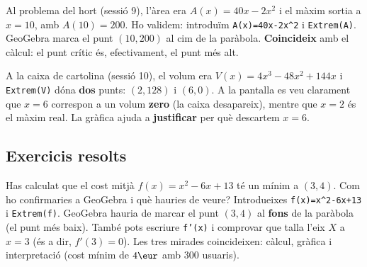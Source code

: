 \begin{exemple}
Al problema del hort (sessió 9), l'àrea era $A(x)=40x-2x^2$ i el màxim sortia a $x=10$,
amb $A(10)=200$. Ho validem: introduïm \texttt{A(x)=40x-2x\^{}2} i \texttt{Extrem(A)}.
GeoGebra marca el punt $(10,200)$ al cim de la paràbola. \textbf{Coincideix} amb el
càlcul: el punt crític és, efectivament, el punt més alt.
\begin{center}

\end{center}
\end{exemple}

\begin{exemple}
A la caixa de cartolina (sessió 10), el volum era $V(x)=4x^3-48x^2+144x$ i
\texttt{Extrem(V)} dóna \textbf{dos} punts: $(2,128)$ i $(6,0)$. A la pantalla es veu
clarament que $x=6$ correspon a un volum \textbf{zero} (la caixa desapareix), mentre que
$x=2$ és el màxim real. La gràfica ajuda a \textbf{justificar} per què descartem $x=6$.
\end{exemple}

\subsection{Exercicis resolts}

\begin{exresolt}
Has calculat que el cost mitjà $f(x)=x^2-6x+13$ té un mínim a $(3,4)$. Com ho
confirmaries a GeoGebra i què hauries de veure?
\solucio
Introdueixes \texttt{f(x)=x\^{}2-6x+13} i \texttt{Extrem(f)}. GeoGebra hauria de marcar
el punt $(3,4)$ al \textbf{fons} de la paràbola (el punt més baix). També pots escriure
\texttt{f'(x)} i comprovar que talla l'eix $X$ a $x=3$ (és a dir, $f'(3)=0$). Les tres
mirades coincideixen: càlcul, gràfica i interpretació (cost mínim de $4\eur$ amb $300$
usuaris).
\end{exresolt}

